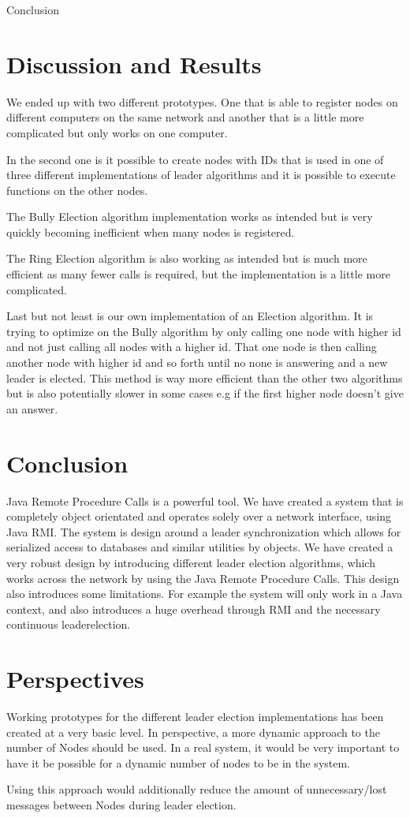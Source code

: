{Conclusion}
\section{Discussion and Results}
We ended up with two different prototypes. One that is able to register nodes on different computers on the same network and another that is a little more complicated but only works on one computer.

In the second one is it possible to create nodes with IDs that is used in one of three different implementations of leader algorithms and it is possible to execute functions on the other nodes.

The Bully Election algorithm implementation works as intended but is very quickly becoming inefficient when many nodes is registered.

The Ring Election algorithm is also working as intended but is much more efficient as many fewer calls is required, but the implementation is a little more complicated.

Last but not least is our own implementation of an Election algorithm. It is trying to optimize on the Bully algorithm by only calling one node with higher id and not just calling all nodes with a higher id. That one node is then calling another node with higher id and so forth until no none is answering and a new leader is elected.
This method is way more efficient than the other two algorithms but is also potentially slower in some cases e.g if the first higher node doesn't give an answer.

\section{Conclusion}
Java Remote Procedure Calls is a powerful tool. We have created a system that is completely object orientated and operates solely over a network interface, using Java RMI. The system is design around a leader synchronization which allows for serialized access to databases and similar utilities by objects. We have created a very robust design by introducing different leader election algorithms, which works across the network by using the Java Remote Procedure Calls.
This design also introduces some limitations. For example the system will only work in a Java context, and also introduces a huge overhead through RMI and the necessary continuous leaderelection.


\section{Perspectives}
Working prototypes for the different leader election implementations has been created at a very basic level. In perspective, a more dynamic approach to the number of Nodes should be used. In a real system, it would be very important to have it be possible for a dynamic number of nodes to be in the system. 

Using this approach would additionally reduce the amount of unnecessary/lost messages between Nodes during leader election. 
